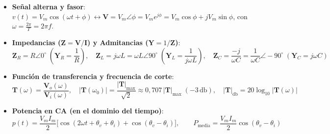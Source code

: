 \begin{ley}
\begin{itemize}
    \item \textbf{Señal alterna y fasor}: $v(t) = V_m\cos(\omega t + \phi) \longleftrightarrow \mathbf{V} = V_m\angle\phi = V_m e^{j\phi} = V_m\cos\phi + j V_m\sin\phi$, con $\omega = \frac{2\pi}{T} = 2\pi f$.
    \item \textbf{Impedancias ($\mathbf{Z} = \mathbf{V}/\mathbf{I}$) y Admitancias ($\mathbf{Y} = 1/\mathbf{Z}$)}:
    \begin{equation*}
        \mathbf{Z}_R = R\angle 0^\circ \;\left(\mathbf{Y}_R = \frac{1}{R}\right), \quad \mathbf{Z}_L = j\omega L = \omega L\angle 90^\circ \;\left(\mathbf{Y}_L = \frac{1}{j\omega L}\right), \quad \mathbf{Z}_C = \frac{-j}{\omega C} = \frac{1}{\omega C}\angle -90^\circ \;\left(\mathbf{Y}_C = j\omega C\right)
    \end{equation*}
    \item \textbf{Función de transferencia y frecuencia de corte}:
    \begin{equation*}
        \mathbf{T}(\omega) = \frac{\mathbf{V}_o(\omega)}{\mathbf{V}_i(\omega)}, \quad |\mathbf{T}(\omega_0)| = \frac{|\mathbf{T}|_{\max}}{\sqrt{2}} \approx 0{,}707\,|\mathbf{T}|_{\max} \;(-3\,\si{\decibel}), \quad |\mathbf{T}|_{\si{\decibel}} = 20\log_{10}|\mathbf{T}(\omega)|
    \end{equation*}
    \item \textbf{Potencia en CA (en el dominio del tiempo)}:
    \begin{equation*}
        p(t) = \frac{V_m I_m}{2}\big[\cos(2\omega t + \theta_v + \theta_i) + \cos(\theta_v - \theta_i)\big], \qquad P_{\text{media}} = \frac{V_m I_m}{2}\cos(\theta_v - \theta_i)
    \end{equation*}
\end{itemize}
\end{ley}
